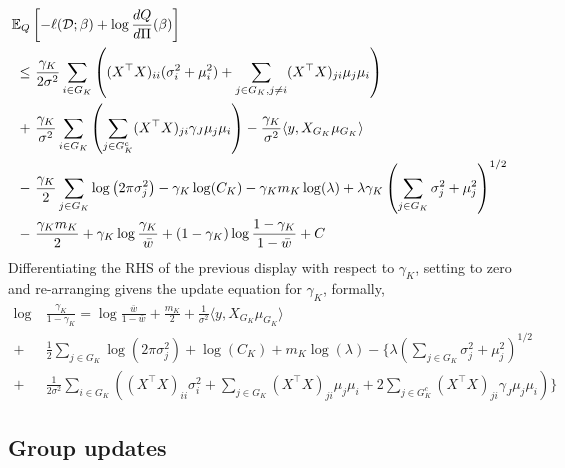 \documentclass[12pt]{article}
\begin{document}
\begin{equation*}
\begin{aligned}
    \mathbb{E}_{Q} & \left[ 
	- \ell(\mathcal{D}; \beta) + \log \frac{dQ}{d\Pi}(\beta) 
    \right]  \\
\leq &\
    \frac{\gamma_K}{2\sigma^2}
    \sum_{i \in G_K} \left( 
	    (X^\top X)_{ii} (\sigma_i^2 + \mu_i^2)
	+
	\sum_{j \in G_K, j\neq i} 
	    (X^\top X)_{ji} \mu_j \mu_i
    \right ) \\
+ &\
    \frac{\gamma_K}{\sigma^2}
    \sum_{i \in G_K} \left( 
    \sum_{j \in G_K^c} (X^\top X)_{ji} 
	\gamma_{J} \mu_j \mu_i
    \right )
-
    \frac{\gamma_K}{\sigma^2} \langle y, X_{G_K} \mu_{G_K} \rangle \\
- &\
    \frac{\gamma_K}{2} \sum_{j \in G_K} \log \left( 2 \pi \sigma_j^2 \right) 
-
    \gamma_K \log(C_K )
-
    \gamma_K m_K \log (\lambda) 
+
    \lambda \gamma_K \left( \sum_{j \in G_K} 
	\sigma_j^2 + \mu_j^2
    \right)^{1/2} \\
- &\
    \frac{\gamma_K m_K}{2} 
+ 
    \gamma_K \log \frac{\gamma_K}{\bar{w}}
+ 
    (1 - \gamma_K) \log \frac{1 - \gamma_K}{1 - \bar{w}}
+ C
\end{aligned}
\end{equation*}
Differentiating the RHS of the previous display with respect to $\gamma_K$, setting to zero and re-arranging givens the update equation for $\gamma_K$, formally,
\begin{equation} \label{eq:update_gamma} 
\begin{aligned}
    \log &\ \frac{\gamma_K}{1-\gamma_K} = 
    \log \frac{\bar{w}}{1-\bar{w}}
+ 
    \frac{m_K}{2}  
+
    \frac{1}{\sigma^2} \langle y, X_{G_K} \mu_{G_K} \rangle  \\
+ &\ 
    \frac{1}{2} \sum_{j \in G_K} \log \left( 2 \pi \sigma_j^2 \right)
+
    \log(C_K )
+
    m_K \log (\lambda)
-
\Bigg\{ 
    \lambda \left( \sum_{j \in G_K} 
	\sigma_j^2 + \mu_j^2
    \right)^{1/2}  \\
+ &\
    \frac{1}{2\sigma^2}
    \sum_{i \in G_K} \left( 
    (X^\top X)_{ii} \sigma_i^2
    +
    \sum_{j \in G_K} 
	(X^\top X)_{ji} \mu_j \mu_i
+
    2 \sum_{j \in G_K^c} (X^\top X)_{ji} 
	\gamma_{J} \mu_j \mu_i
    \right )
\Bigg\}
\end{aligned}
\end{equation}

\subsection{Group updates}
\end{document}
